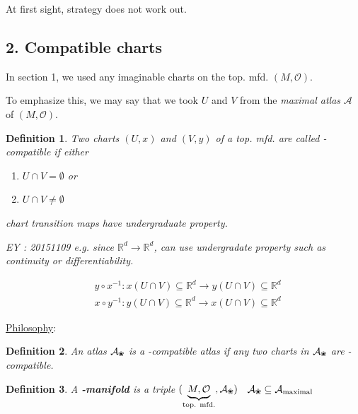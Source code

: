 \documentclass[10pt]{amsart}
\newtheorem{definition}{Definition}
\begin{document}
\begin{multicols*}{2}
At first sight, strategy does not work out.  

\subsection{2. Compatible charts}

In section 1, we used any imaginable charts on the top. mfd. $(M,\mathcal{O})$.  

To emphasize this, we may say that we took $U$ and $V$ from the \emph{maximal atlas} $\mathcal{A}$ of $(M,\mathcal{O})$.  


\begin{definition}
Two charts $(U,x)$ and $(V,y)$ of a top. mfd. are called -compatible if 
either
\begin{enumerate}
\item[(a)] $U \cap V = \emptyset$
or  \item[(b)] $U\cap V \neq \emptyset$
\end{enumerate}
chart transition maps have undergraduate  property.

EY : 20151109 e.g. since $\mathbb{R}^d \to \mathbb{R}^d$, can use undergradate  property such as continuity or differentiability.

\[
\begin{aligned}
& y \circ x^{-1} : x(U \cap V) \subseteq \mathbb{R}^d  \to y(U\cap V) \subseteq \mathbb{R}^d  \\
& x\circ y^{-1} : y(U\cap V) \subseteq \mathbb{R}^d   \to x(U\cap V) \subseteq \mathbb{R}^d
\end{aligned}
\]
\end{definition}

\underline{Philosophy}: 

\begin{definition}
An atlas $\mathcal{A}_{\text{\ding{96}}}$ is a -compatible atlas if any two charts in $\mathcal{A}_{\text{\ding{96}}}$ are -compatible.

\end{definition}

\begin{definition}
A \textbf{-manifold} is a triple $(\underbrace{ M,\mathcal{O} }_{\text{top. mfd.} }, \mathcal{A}_{\text{\ding{96}}})$ \quad \, $\mathcal{A}_{\text{\ding{96}}} \subseteq \mathcal{A}_{\text{maximal}} $
\end{definition}



\end{multicols*}
\end{document}
